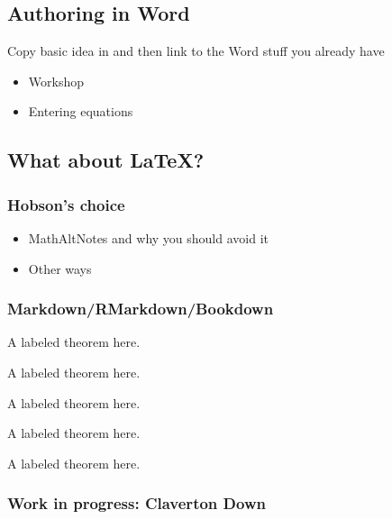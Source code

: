 \documentclass[
  17pt,
  english,
  a4paper]{extarticle}
\providecommand{\tightlist}{%
  \setlength{\itemsep}{0pt}\setlength{\parskip}{0pt}}
\theoremstyle{plain}
\theoremstyle{plain}
\theoremstyle{plain}
\theoremstyle{plain}
\theoremstyle{plain}
\theoremstyle{definition}
\theoremstyle{definition}
\theoremstyle{definition}
\theoremstyle{remark}
\let\BeginKnitrBlock\begin \let\EndKnitrBlock\end
\renewcommand{\;}{\,}
\begin{document}
\hypertarget{authoring-in-word}{%
\subsection{Authoring in Word}\label{authoring-in-word}}

Copy basic idea in and then link to the Word stuff you already have

\begin{itemize}
\tightlist
\item
  Workshop
\item
  Entering equations
\end{itemize}

\hypertarget{what-about-latex}{%
\subsection{What about LaTeX?}\label{what-about-latex}}

\hypertarget{hobsons-choice}{%
\subsubsection{Hobson's choice}\label{hobsons-choice}}

\begin{itemize}
\tightlist
\item
  MathAltNotes and why you should avoid it
\item
  Other ways
\end{itemize}

\hypertarget{markdownrmarkdownbookdown}{%
\subsubsection{Markdown/RMarkdown/Bookdown}\label{markdownrmarkdownbookdown}}

\BeginKnitrBlock{theorem}
\label{thm:thm1} A labeled theorem here.
\EndKnitrBlock{theorem}

\BeginKnitrBlock{proposition}
\label{prp:prop1} A labeled theorem here.
\EndKnitrBlock{proposition}

\BeginKnitrBlock{lemma}
\label{lem:lem1} A labeled theorem here.
\EndKnitrBlock{lemma}

\BeginKnitrBlock{theorem}
\label{thm:thm2} A labeled theorem here.
\EndKnitrBlock{theorem}

\BeginKnitrBlock{corollary}
\label{cor:cor1} A labeled theorem here.
\EndKnitrBlock{corollary}

\hypertarget{work-in-progress-claverton-down}{%
\subsubsection{Work in progress: Claverton Down}\label{work-in-progress-claverton-down}}
\end{document}

